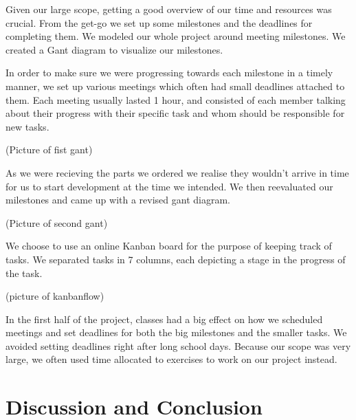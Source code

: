 Given our large scope, getting a good overview of our time and resources was crucial. From the get-go we set up some milestones and the deadlines for completing them. We modeled our whole project around meeting milestones. We created a Gant diagram to visualize our milestones.

In order to make sure we were progressing towards each milestone in a timely manner, we set up various meetings which often had small deadlines attached to them. Each meeting usually lasted 1 hour, and consisted of each member talking about their progress with their specific task and whom should be responsible for new tasks.

(Picture of fist gant)

As we were recieving the parts we ordered we realise they wouldn't arrive in time for us to start development at the time we intended. We then reevaluated our milestones and came up with a revised gant diagram.

(Picture of second gant)

We choose to use an online Kanban board for the purpose of keeping track of tasks. We separated tasks in 7 columns, each depicting a stage in the progress of the task.

(picture of kanbanflow)

In the first half of the project, classes had a big effect on how we scheduled meetings and set deadlines for both the big milestones and the smaller tasks. We avoided setting deadlines right after long school days. Because our scope was very large, we often used time allocated to exercises to work on our project instead.

\section{Discussion and Conclusion}


